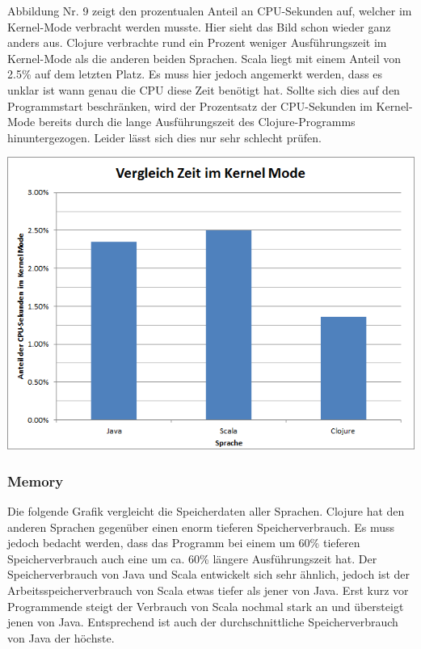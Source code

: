 \documentclass{fancydocument}
\begin{document}
Abbildung Nr. 9 zeigt den prozentualen Anteil an CPU-Sekunden auf, welcher im Kernel-Mode verbracht werden musste. Hier sieht das Bild schon wieder ganz anders aus. Clojure verbrachte rund ein Prozent weniger Ausführungszeit im Kernel-Mode als die anderen beiden Sprachen. Scala liegt mit einem Anteil von 2.5\% auf dem letzten Platz. Es muss hier jedoch angemerkt werden, dass es unklar ist wann genau die CPU diese Zeit benötigt hat. Sollte sich dies auf den Programmstart beschränken, wird der Prozentsatz der CPU-Sekunden im Kernel-Mode bereits durch die lange Ausführungszeit des Clojure-Programms hinuntergezogen. Leider lässt sich dies nur sehr schlecht prüfen.
\begin{center}
\includegraphics[width=\linewidth]{bilder/KernelModeAll.png}
\end{center}

\subsubsection{Memory}
Die folgende Grafik vergleicht die Speicherdaten aller Sprachen. Clojure hat den anderen Sprachen gegenüber einen enorm tieferen Speicherverbrauch. Es muss jedoch bedacht werden, dass das Programm bei einem um 60\% tieferen Speicherverbrauch auch eine um ca. 60\% längere Ausführungszeit hat. Der Speicherverbrauch von Java und Scala entwickelt sich sehr ähnlich, jedoch ist der Arbeitsspeicherverbrauch von Scala etwas tiefer als jener von Java. Erst kurz vor Programmende steigt der Verbrauch von Scala nochmal stark an und übersteigt jenen von Java. Entsprechend ist auch der durchschnittliche Speicherverbrauch von Java der höchste.
\end{document}
